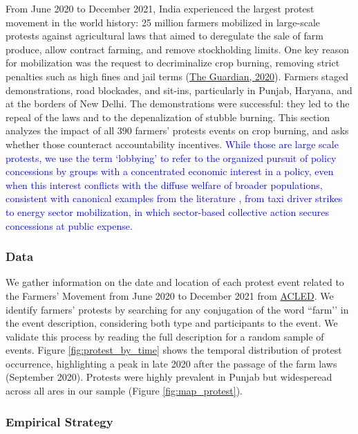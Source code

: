 \documentclass[12pt]{article}
\begin{document}
 From June 2020 to December 2021, India experienced the largest protest movement in the world history: 25 million farmers mobilized in large-scale protests against agricultural laws that aimed to deregulate the sale of farm produce, allow contract farming, and remove stockholding limits. One key reason for mobilization was the request to decriminalize crop burning, removing strict penalties such as high fines and jail terms (\href{https://www.theguardian.com/world/2020/nov/30/indian-farmers-march-on-delhi-in-protest-against-agriculture-laws}{The Guardian, 2020}). Farmers staged demonstrations, road blockades, and sit-ins, particularly in Punjab, Haryana, and at the borders of New Delhi. The demonstrations were successful: they led to the repeal of the laws and to the depenalization of stubble burning. This section analyzes the impact of all 390 farmers' protests events on crop burning, and asks whether those counteract accountability incentives. \textcolor{blue}{While those are large scale protests, we use the term `lobbying' to refer to the organized pursuit of policy concessions by groups with a concentrated economic interest in a policy, even when this interest conflicts with the diffuse welfare of broader populations, consistent with canonical examples from the literature \citep{olson1971logic}, from taxi driver strikes to energy sector mobilization, in which sector-based collective action secures concessions at public expense.}

\subsubsection{Data\label{sssec:data2}}
We gather information on the date and location of each protest event related to the Farmers' Movement from June 2020 to December 2021 from \href{https://acleddata.com/}{ACLED}. We identify farmers' protests by searching for any conjugation of the word  ``farm’’ in the event description, considering both type and participants to the event. We validate this process by reading the full description for a random sample of events.  Figure \ref{fig:protest_by_time} shows the temporal distribution of protest occurrence, highlighting a peak in late 2020 after the passage of the farm laws (September 2020). Protests were highly prevalent in Punjab but widesperead across all ares in our sample (Figure \ref{fig:map_protest}).

\subsubsection{Empirical Strategy\label{sssec:empirical2}}
\end{document}
